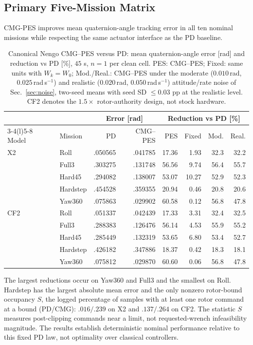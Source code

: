 \documentclass[letterpaper, 10 pt, conference]{ieeeconf}
\begin{document}
\subsection{Primary Five-Mission Matrix}
CMG-PES improves mean quaternion-angle tracking error in all ten nominal missions while respecting the same actuator interface as the PD baseline.
%
\begin{table}[h]
\caption{Canonical Nengo CMG--PES versus PD: mean quaternion-angle error
[rad] and reduction vs PD [\%], $45$ s, $n=1$ per clean cell. PES: CMG--PES;
Fixed: same units with $W_k=W_0$; Mod./Real.: CMG--PES under the moderate
($0.010$\,rad, $0.025$\,rad\,s$^{-1}$) and realistic ($0.020$\,rad,
$0.050$\,rad\,s$^{-1}$) attitude/rate noise of Sec.~\ref{sec:noise}, two-seed
means with seed SD $\le0.03$ pp at the realistic level. CF2 denotes the
$1.5\times$ rotor-authority design, not stock hardware.}
\label{tab:mujoco}\label{tab:noise}\centering\scriptsize
\setlength{\tabcolsep}{2.4pt}
\begin{tabular}{@{}llrrrrrr@{}}
\toprule
&&\multicolumn{2}{c}{Error [rad]}&\multicolumn{4}{c}{Reduction vs PD [\%]}\\
\cmidrule(lr){3-4}\cmidrule(l){5-8}
Model&Mission&PD&CMG--PES&PES&Fixed&Mod.&Real.\\\midrule
X2&Roll&.050565&.041785&17.36&1.93&32.3&32.2\\
&Full3&.303275&.131748&56.56&9.74&56.4&55.7\\
&Hard45&.294082&.138007&53.07&10.27&52.9&52.3\\
&Hardstep&.454528&.359355&20.94&0.46&20.8&20.6\\
&Yaw360&.075863&.029902&60.58&0.12&56.8&47.8\\\midrule
CF2&Roll&.051337&.042439&17.33&3.31&32.4&32.5\\
&Full3&.288383&.126476&56.14&4.53&55.9&55.2\\
&Hard45&.285449&.132319&53.65&6.80&53.4&52.7\\
&Hardstep&.426182&.347886&18.37&0.42&18.3&18.1\\
&Yaw360&.075812&.029870&60.60&0.06&56.8&47.8\\\bottomrule
\end{tabular}
\end{table}
%
The largest reductions occur on Yaw360 and Full3 and the smallest on Roll.
Hardstep has the largest absolute mean error and the only nonzero rotor-bound
occupancy $S$, the logged percentage of samples with at least one rotor
command at a bound (PD/CMG): $.016/.239$ on X2 and $.137/.264$ on CF2. The
statistic $S$ measures post-clipping commands near a limit, not
requested-wrench infeasibility magnitude. The results
establish deterministic nominal performance relative to this fixed PD law,
not optimality over classical controllers.
\end{document}
